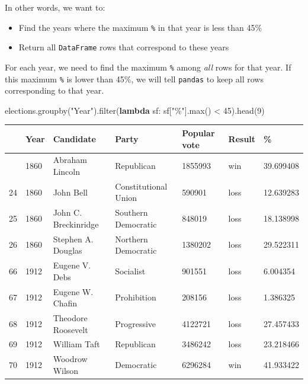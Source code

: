 \documentclass[
  letterpaper,
  DIV=11,
  numbers=noendperiod]{scrreprt}
\newenvironment{Shaded}{\begin{snugshade}}{\end{snugshade}}
\newcommand{\BuiltInTok}[1]{\textcolor[rgb]{0.00,0.23,0.31}{#1}}
\newcommand{\DecValTok}[1]{\textcolor[rgb]{0.68,0.00,0.00}{#1}}
\newcommand{\KeywordTok}[1]{\textcolor[rgb]{0.00,0.23,0.31}{\textbf{#1}}}
\newcommand{\NormalTok}[1]{\textcolor[rgb]{0.00,0.23,0.31}{#1}}
\newcommand{\OperatorTok}[1]{\textcolor[rgb]{0.37,0.37,0.37}{#1}}
\newcommand{\StringTok}[1]{\textcolor[rgb]{0.13,0.47,0.30}{#1}}
\providecommand{\tightlist}{%
  \setlength{\itemsep}{0pt}\setlength{\parskip}{0pt}}\usepackage{longtable,booktabs,array}
\begin{document}
In other words, we want to:

\begin{itemize}
\tightlist
\item
  Find the years where the maximum \texttt{\%} in that year is less than
  45\%
\item
  Return all \texttt{DataFrame} rows that correspond to these years
\end{itemize}

For each year, we need to find the maximum \texttt{\%} among \emph{all}
rows for that year. If this maximum \texttt{\%} is lower than 45\%, we
will tell \texttt{pandas} to keep all rows corresponding to that year.

\begin{Shaded}
\begin{Highlighting}[]
\NormalTok{elections.groupby(}\StringTok{"Year"}\NormalTok{).}\BuiltInTok{filter}\NormalTok{(}\KeywordTok{lambda}\NormalTok{ sf: sf[}\StringTok{"\%"}\NormalTok{].}\BuiltInTok{max}\NormalTok{() }\OperatorTok{\textless{}} \DecValTok{45}\NormalTok{).head(}\DecValTok{9}\NormalTok{)}
\end{Highlighting}
\end{Shaded}

\begin{longtable}[]{@{}lllllll@{}}
\toprule\noalign{}
& Year & Candidate & Party & Popular vote & Result & \% \\
\midrule\noalign{}
\endhead
\bottomrule\noalign{}
\endlastfoot
23 & 1860 & Abraham Lincoln & Republican & 1855993 & win & 39.699408 \\
24 & 1860 & John Bell & Constitutional Union & 590901 & loss &
12.639283 \\
25 & 1860 & John C. Breckinridge & Southern Democratic & 848019 & loss &
18.138998 \\
26 & 1860 & Stephen A. Douglas & Northern Democratic & 1380202 & loss &
29.522311 \\
66 & 1912 & Eugene V. Debs & Socialist & 901551 & loss & 6.004354 \\
67 & 1912 & Eugene W. Chafin & Prohibition & 208156 & loss & 1.386325 \\
68 & 1912 & Theodore Roosevelt & Progressive & 4122721 & loss &
27.457433 \\
69 & 1912 & William Taft & Republican & 3486242 & loss & 23.218466 \\
70 & 1912 & Woodrow Wilson & Democratic & 6296284 & win & 41.933422 \\
\end{longtable}
\end{document}
